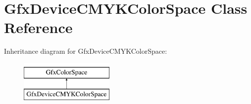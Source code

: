 \hypertarget{class_gfx_device_c_m_y_k_color_space}{}\section{Gfx\+Device\+C\+M\+Y\+K\+Color\+Space Class Reference}
\label{class_gfx_device_c_m_y_k_color_space}
Inheritance diagram for Gfx\+Device\+C\+M\+Y\+K\+Color\+Space\+:\begin{figure}[H]
\begin{center}
\leavevmode
\includegraphics[height=2.000000cm]{class_gfx_device_c_m_y_k_color_space}
\end{center}
\end{figure}
